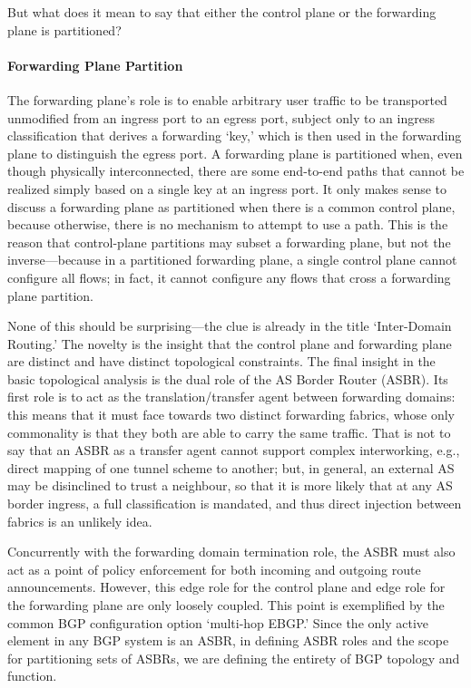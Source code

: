 But what does it mean to say that either the control plane or the forwarding plane is partitioned?

\paragraph{Forwarding Plane Partition}

The forwarding plane's role is to enable arbitrary user traffic to be transported unmodified from an ingress port to an egress port, subject only to an ingress classification that derives a forwarding `key,' which is then used in the forwarding plane to distinguish the egress port. A forwarding plane is partitioned when, even though physically interconnected, there are some end-to-end paths that cannot be realized simply based on a single key at an ingress port. It only makes sense to discuss a forwarding plane as partitioned when there is a common control plane, because otherwise, there is no mechanism to attempt to use a path. This is the reason that control-plane partitions may subset a forwarding plane, but not the inverse—because in a partitioned forwarding plane, a single control plane cannot configure all flows; in fact, it cannot configure any flows that cross a forwarding plane partition.

None of this should be surprising—the clue is already in the title `Inter-Domain Routing.' The novelty is the insight that the control plane and forwarding plane are distinct and have distinct topological constraints. The final insight in the basic topological analysis is the dual role of the AS Border Router (ASBR). Its first role is to act as the translation/transfer agent between forwarding domains: this means that it must face towards two distinct forwarding fabrics, whose only commonality is that they both are able to carry the same traffic. That is not to say that an ASBR as a transfer agent cannot support complex interworking, e.g., direct mapping of one tunnel scheme to another; but, in general, an external AS may be disinclined to trust a neighbour, so that it is more likely that at any AS border ingress, a full classification is mandated, and thus direct injection between fabrics is an unlikely idea.

Concurrently with the forwarding domain termination role, the ASBR must also act as a point of policy enforcement for both incoming and outgoing route announcements. However, this edge role for the control plane and edge role for the forwarding plane are only loosely coupled. This point is exemplified by the common BGP configuration option `multi-hop EBGP.' Since the only active element in any BGP system is an ASBR, in defining ASBR roles and the scope for partitioning sets of ASBRs, we are defining the entirety of BGP topology and function.


